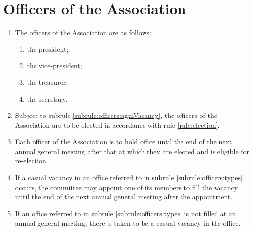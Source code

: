 \section{Officers of the Association}
\label{rule:officers}

\begin{enumerate}
	\item \label{subrule:officers:types} The officers of the Association are as follows:
	\begin{enumerate}
		\item the president;
		\item the vice-president;
		\item the treasurer;
		\item the secretary.
	\end{enumerate}
	
	\item Subject to subrule \ref{subrule:officers:agmVacancy}, the officers of the Association are to be elected in accordance with rule \ref{rule:election}.
	\item Each officer of the Association is to hold office until the end of the next annual general meeting after that at which they are elected and is eligible for re-election.
	\item \label{subrule:officers:casualVacancy} If a casual vacancy in an office referred to in subrule \ref{subrule:officers:types} occurs, the committee may appoint one of its members to fill the vacancy until the end of the next annual general meeting after the appointment.
	\item \label{subrule:officers:agmVacancy} If an office referred to in subrule \ref{subrule:officers:types} is not filled at an annual general meeting, there is taken to be a casual vacancy in the office.
\end{enumerate}